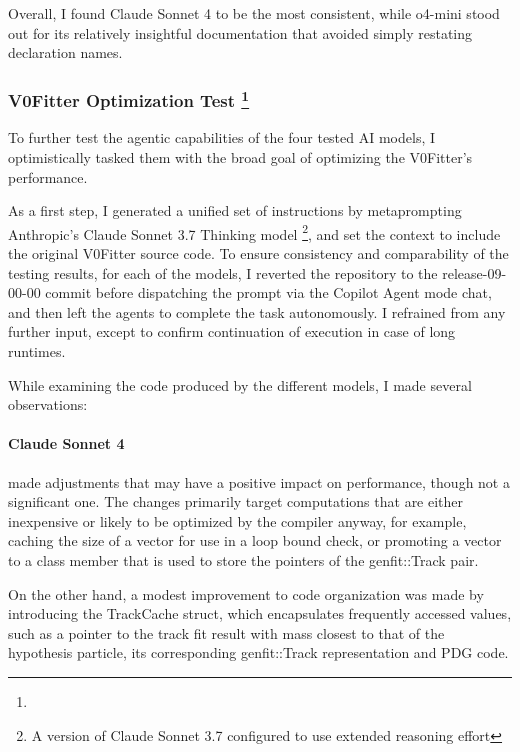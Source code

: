 \vspace{\baselineskip}
Overall, I found Claude Sonnet 4 to be the most consistent, while o4-mini stood out for its relatively insightful documentation that avoided simply restating declaration names.

\def\sectitle{V0Fitter Optimization Test}
\subsubsection%
[\sectitle]
{\sectitle
  \footnote{}
}
To further test the agentic capabilities of the four tested AI models, I optimistically tasked them with the broad goal of optimizing the V0Fitter's performance.

As a first step, I generated a unified set of instructions by metaprompting Anthropic's Claude Sonnet 3.7 Thinking model%
\footnote{A version of Claude Sonnet 3.7 \cite{claude-sonnet37} configured to use extended reasoning effort},
and set the context to include the original V0Fitter source code.
To ensure consistency and comparability of the testing results, for each of the models, I reverted the repository to the release-09-00-00 commit before dispatching the prompt via the Copilot Agent mode chat, and then left the agents to complete the task autonomously.
I refrained from any further input, except to confirm continuation of execution in case of long runtimes.

\vspace{\baselineskip}
While examining the code produced by the different models, I made several observations:

\vspace{-1\baselineskip}
\paragraph{Claude Sonnet 4} made adjustments that may have a positive impact on performance, though not a significant one.
The changes primarily target computations that are either inexpensive or likely to be optimized by the compiler anyway, for example, caching the size of a vector for use in a loop bound check, or promoting a vector to a class member that is used to store the pointers of the genfit::Track pair.

On the other hand, a modest improvement to code organization was made by introducing the TrackCache struct, which encapsulates frequently accessed values, such as a pointer to the track fit result with mass closest to that of the hypothesis particle, its corresponding genfit::Track representation and PDG code.

